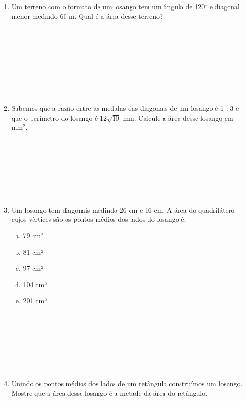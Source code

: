 \documentclass[a4paper,14pt]{article}
\begin{document}
\begin{multicols}{2}
\begin{enumerate}
    		\item Um terreno com o formato de um losango tem um ângulo de 120$^\circ$ e diagonal menor medindo 60 m. Qual é a área desse terreno?\\\\\\\\\\\\\\\\\\
    		\item Sabemos que a razão entre as medidas das diagonais de um losango é 1 : 3 e que o perímetro do losango é $12\sqrt{10}$ mm. Calcule a área desse losango em mm$^2$. \\\\\\\\\\\\\\\\
    		\item Um losango tem diagonais medindo 26 cm e 16 cm. A área do quadrilátero cujos vértices são os pontos médios dos lados do losango é:
    		\begin{enumerate}[a)]
    			\item 79 cm²
    			\item 81 cm²
    			\item 97 cm²
    			\item 104 cm²
    			\item 201 cm²\\\\\\\\\\\\\\\\
    		\end{enumerate}
    	    \item Unindo os pontos médios dos lados de um retângulo construímos um losango. Mostre que a área desse losango é a metade da área do retângulo.
	    \end{enumerate}
    $~$ \\ $~$ \\ $~$ \\ $~$
    \end{multicols}
\end{document}
